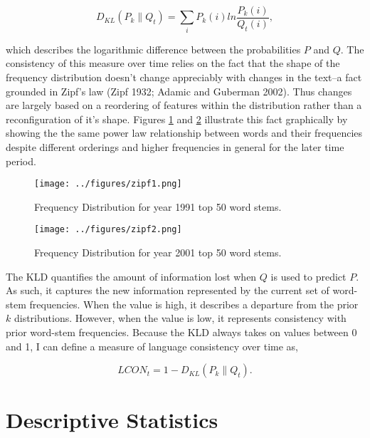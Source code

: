 \begin{equation}
	D_{KL}(P_k\|Q_t) = \sum_i{P_k(i)ln\frac{P_k(i)}{Q_t(i)}},
\end{equation}

\noindent which describes the logarithmic difference between the probabilities $P$ and $Q$. The consistency of this measure over time relies on the fact that the shape of the frequency distribution doesn't change appreciably with changes in the text--a fact grounded in Zipf's law (Zipf 1932; Adamic and Guberman 2002). Thus changes are largely based on a reordering of features within the distribution rather than a reconfiguration of it's shape. Figures \ref{zipf1} and \ref{zipf2} illustrate this fact graphically by showing the the same power law relationship between words and their frequencies despite different orderings and higher frequencies in general for the later time period.

\begin{figure}[p!]
\begin{center}
\texttt{[image: ../figures/zipf1.png]}
\caption[Frequency Distribution 1991]{Frequency Distribution for year 1991 top 50 word stems. \label{zipf1}}
\end{center}
\end{figure}

\begin{figure}[p!]
\begin{center}
\texttt{[image: ../figures/zipf2.png]}
\caption[Frequency Distribution 2001]{Frequency Distribution for year 2001 top 50 word stems. \label{zipf2}}
\end{center}
\end{figure}

The KLD quantifies the amount of information lost when $Q$ is used to predict $P$. As such, it captures the new information represented by the current set of word-stem frequencies. When the value is high, it describes a departure from the prior $k$ distributions. However, when the value is low, it represents consistency with prior word-stem frequencies. Because the KLD always takes on values between 0 and 1, I can define a measure of language consistency over time as,

\begin{equation}
	LCON_t=1-D_{KL}(P_k\|Q_t).
\end{equation}


\section{Descriptive Statistics}

